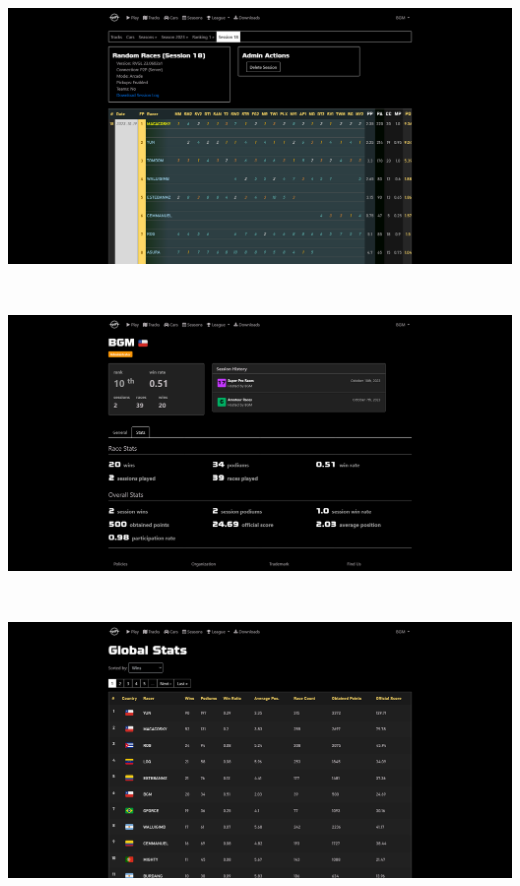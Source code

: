 \includegraphics[width=15cm, height=8cm]{img/session.png} \\

\includegraphics[width=15cm, height=8cm]{img/profile1.png} \\

\includegraphics[width=15cm, height=8cm]{img/stats.png} \\

